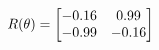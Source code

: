 \documentclass[preview]{standalone}
\begin{document}
\begin{align*}
\special{dvisvgm:raw <g id='unique000'>}R(\theta) = \begin{bmatrix}-0.16 & 0.99\\-0.99 & -0.16\end{bmatrix}\special{dvisvgm:raw </g>}
\end{align*}
\end{document}
